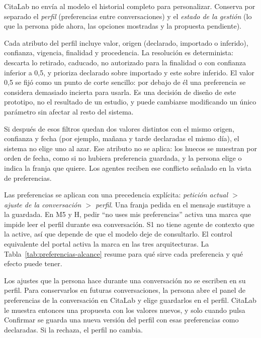 CitaLab no envía al modelo el historial completo para personalizar. Conserva
por separado el \emph{perfil} (preferencias entre conversaciones) y el
\emph{estado de la gestión} (lo que la persona pide ahora, las opciones
mostradas y la propuesta pendiente).

Cada atributo del perfil incluye valor, origen (declarado, importado o
inferido), confianza, vigencia, finalidad y procedencia. La resolución es
determinista: descarta lo retirado, caducado, no autorizado para la finalidad o
con confianza inferior a 0,5, y prioriza declarado sobre importado y este sobre
inferido. El valor 0,5 se fijó como un punto de corte sencillo: por debajo de él
una preferencia se considera demasiado incierta para usarla. Es una decisión de
diseño de este prototipo, no el resultado de un estudio, y puede cambiarse
modificando un único parámetro sin afectar al resto del sistema.

Si después de esos filtros quedan dos valores distintos con el mismo origen,
confianza y fecha (por ejemplo, mañana y tarde declaradas el mismo día), el
sistema no elige uno al azar. Ese atributo no se aplica: los huecos se muestran
por orden de fecha, como si no hubiera preferencia guardada, y la persona elige
o indica la franja que quiere. Los agentes reciben ese conflicto señalado en la
vista de preferencias.

Las preferencias se aplican con una precedencia explícita: \emph{petición actual
$>$ ajuste de la conversación $>$ perfil}. Una franja pedida en el mensaje
sustituye a la guardada. En M5 y H, pedir \enquote{no uses mis preferencias}
activa una marca que impide leer el perfil durante esa conversación. S1 no
tiene agente de contexto que la active, así que depende de que el modelo deje
de consultarlo. El control equivalente del portal activa la marca en las tres
arquitecturas. La Tabla~\ref{tab:preferencias-alcance}
resume para qué sirve cada preferencia y qué efecto puede tener.

Los ajustes que la persona hace durante una conversación no se escriben en su
perfil. Para conservarlos en futuras conversaciones, la persona abre el panel de
preferencias de la conversación en CitaLab y elige guardarlos en el perfil.
CitaLab le muestra entonces una propuesta con los valores nuevos, y solo cuando
pulsa Confirmar se guarda una nueva versión del perfil con esas preferencias
como declaradas. Si la rechaza, el perfil no cambia.

